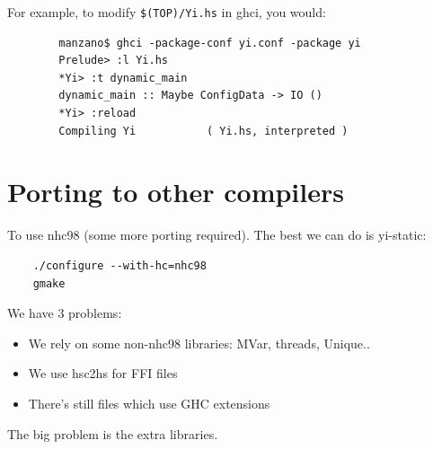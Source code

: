 \documentclass[]{article}
\newcommand{\code}[1]{\texttt{#1}}
\begin{document}
For example, to modify \code{\$(TOP)/Yi.hs} in ghci, you would:

{\small
\begin{verbatim}
        manzano$ ghci -package-conf yi.conf -package yi
        Prelude> :l Yi.hs
        *Yi> :t dynamic_main
        dynamic_main :: Maybe ConfigData -> IO ()
        *Yi> :reload
        Compiling Yi           ( Yi.hs, interpreted )
\end{verbatim}
}

\section{Porting to other compilers}

To use nhc98 (some more porting required). The best we can do is
yi-static:
\begin{verbatim}
    ./configure --with-hc=nhc98
    gmake
\end{verbatim}

We have 3 problems:
\begin{itemize}
    \item We rely on some non-nhc98 libraries: MVar, threads, Unique..
    \item We use hsc2hs for FFI files
    \item There's still files which use GHC extensions
\end{itemize}

The big problem is the extra libraries.



\end{document}
